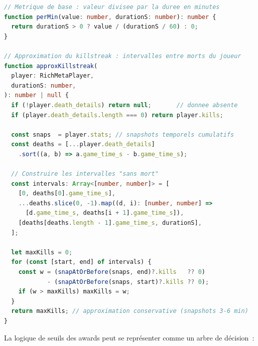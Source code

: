 \documentclass[12pt,a4paper]{article}
\begin{document}
\begin{lstlisting}[language=TypeScript,
  caption={Moteur des awards --- calcul par minute et approximation de killstreak}]
// Metrique de base : valeur divisee par la duree en minutes
function perMin(value: number, durationS: number): number {
  return durationS > 0 ? value / (durationS / 60) : 0;
}

// Approximation du killstreak : intervalles entre morts du joueur
function approxKillstreak(
  player: RichMetaPlayer,
  durationS: number,
): number | null {
  if (!player.death_details) return null;       // donnee absente
  if (player.death_details.length === 0) return player.kills;

  const snaps  = player.stats; // snapshots temporels cumulatifs
  const deaths = [...player.death_details]
    .sort((a, b) => a.game_time_s - b.game_time_s);

  // Construire les intervalles "sans mort"
  const intervals: Array<[number, number]> = [
    [0, deaths[0].game_time_s],
    ...deaths.slice(0, -1).map((d, i): [number, number] =>
      [d.game_time_s, deaths[i + 1].game_time_s]),
    [deaths[deaths.length - 1].game_time_s, durationS],
  ];

  let maxKills = 0;
  for (const [start, end] of intervals) {
    const w = (snapAtOrBefore(snaps, end)?.kills   ?? 0)
            - (snapAtOrBefore(snaps, start)?.kills ?? 0);
    if (w > maxKills) maxKills = w;
  }
  return maxKills; // approximation conservative (snapshots 3-6 min)
}
\end{lstlisting}

La logique de seuils des awards peut se représenter comme un arbre de
décision~:
\end{document}
